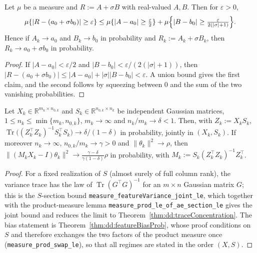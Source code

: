 \begin{lemma}\label{lem:dd:deviationSum}
  \leanok
Let $\mu$ be a measure and $R:=A+\sigma B$ with real-valued $A,B$. Then for $\varepsilon>0$,
\[
  \mu\{|R-(a_0+\sigma b_0)|\ge\varepsilon\}\le\mu\{|A-a_0|\ge\tfrac\varepsilon2\}+\mu\Bigl\{|B-b_0|\ge\tfrac\varepsilon{2(|\sigma|+1)}\Bigr\}.
\]
Hence if $A_k\to a_0$ and $B_k\to b_0$ in probability and $R_k:=A_k+\sigma B_k$, then $R_k\to a_0+\sigma b_0$ in probability.
\end{lemma}

\begin{proof}
  \leanok
If $|A-a_0|<\varepsilon/2$ and $|B-b_0|<\varepsilon/(2(|\sigma|+1))$, then $|R-(a_0+\sigma b_0)|\le|A-a_0|+|\sigma||B-b_0|<\varepsilon$. A union bound gives the first claim, and the second follows by squeezing between $0$ and the sum of the two vanishing probabilities.
\end{proof}

\begin{theorem}\label{thm:dd:featureJoint}
  \leanok
Let $X_k\in\mathbb R^{m_k\times n_{0,k}}$ and $S_k\in\mathbb R^{n_{0,k}\times n_k}$ be independent Gaussian matrices, $1\le n_k\le\min\{m_k,n_{0,k}\}$, $m_k\to\infty$ and $n_k/m_k\to\delta<1$. Then, with $Z_k:=X_kS_k$, $\operatorname{Tr}\bigl((Z_k^\top Z_k)^{-1}S_k^\top S_k\bigr)\to\delta/(1-\delta)$ in probability, jointly in $(X_k,S_k)$.
If moreover $n_k\to\infty$, $n_{0,k}/m_k\to\gamma>0$ and $\|\theta_k\|^2\to\rho$, then $\|(M_kX_k-I)\theta_k\|^2\to\frac{\gamma-\delta}{\gamma(1-\delta)}\rho$ in probability, with $M_k:=S_k(Z_k^\top Z_k)^{-1}Z_k^\top$.
\end{theorem}

\begin{proof}
  \leanok
For a fixed realization of $S$ (almost surely of full column rank), the variance trace has the law of $\operatorname{Tr}(G^\top G)^{-1}$ for an $m\times n$ Gaussian matrix $G$; this is the $S$-section bound \texttt{measure\_featureVariance\_joint\_le}, which together with the product-measure lemma \texttt{measure\_prod\_le\_of\_ae\_section\_le}
gives the joint bound and reduces the limit to Theorem~\ref{thm:dd:traceConcentration}. The bias statement is Theorem~\ref{thm:dd:featureBiasProb}, whose proof conditions on $S$ and therefore exchanges the two factors of the product measure once (\texttt{measure\_prod\_swap\_le}), so that all regimes are stated in the order $(X,S)$.
\end{proof}

